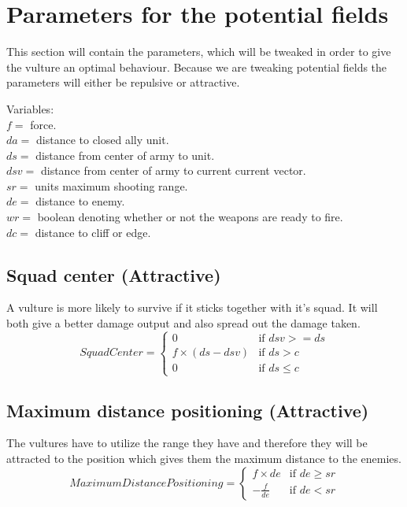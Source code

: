 \section{Parameters for the potential fields}
	This section will contain the parameters, which will be tweaked in order to give the vulture an optimal behaviour. Because we are tweaking 
	potential fields the parameters will either be repulsive or attractive.
	
	Variables:\\
	$f =$ force.\\
	$da =$ distance to closed ally unit.\\
	$ds =$ distance from center of army to unit.\\
	$dsv =$ distance from center of army to current current vector.\\
	$sr =$ units maximum shooting range.\\
	$de =$ distance to enemy.\\
	$wr =$ boolean denoting whether or not the weapons are ready to fire.\\
	$dc =$ distance to cliff or edge.
	
	\subsection*{Squad center (Attractive)}
		A vulture is more likely to survive if it sticks together with it's squad. It will both give a better damage output and also spread out the 
		damage taken.
		\begin{displaymath}
			SquadCenter  = \begin{cases}
					0 & \text{if } dsv >= ds\\
					f \times (ds - dsv) & \text{if } ds > c\\
					0 & \text{if } ds \leq c
				\end{cases}		
		\end{displaymath}
		
		
	\subsection*{Maximum distance positioning (Attractive)}
		The vultures have to utilize the range they have and therefore they will be attracted to the position which gives them the maximum distance 
		to the enemies.
		\begin{displaymath}
			MaximumDistancePositioning = \begin{cases}
					f \times de & \text{if } de \geq sr\\
					- \frac{f}{de} & \text{if } de < sr
				\end{cases}		
		\end{displaymath}
